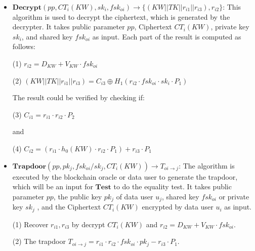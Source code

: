 \documentclass[journal,10pt]{IEEEtran}
\begin{document}
\begin{itemize}
    \item $ \boldsymbol{Decrypt}(pp, CT_i(KW), sk_{i}, fsk_{oi}) \to \{(KW||TK||r_{i1}||r_{i3}), r_{i2}\} $: This algorithm is used to decrypt the ciphertext, which is generated by the decrypter. It takes public parameter $pp$, Ciphertext $CT_i(KW)$, private key $sk_{i}$, and shared key $fsk_{oi}$ as input. Each part of the result is computed as follows: 
    
    (1) $r_{i2} = D_{KW} + V_{KW} \cdot fsk_{oi}$
    
    (2) $(KW||TK||r_{i1}||r_{i3}) = C_{i3} \oplus H_1(r_{i2} \cdot fsk_{oi} \cdot sk_i \cdot P_1)$
    
    The result could be verified by checking if: 
    
    (3) $C_{i1} = r_{i1} \cdot r_{i2} \cdot P_2$
    
    and 
    
    (4) $C_{i2} = (r_{i1} \cdot h_0(KW) \cdot r_{i2} \cdot P_1) + r_{i3} \cdot P_1$
    
    
    \item $ \boldsymbol{Trapdoor}(pp, pk_j, fsk_{oi}/sk_j, CT_i(KW)) \to T_{oi \to j} $: The algorithm is executed by the blockchain oracle or data user to generate the trapdoor, which will be an input for $\boldsymbol{Test}$ to do the equality test. It takes public parameter $pp$, the public key $pk_j$ of data user $u_j$, shared key $fsk_{oi}$ or private key $sk_j$ , and the Ciphertext $CT_i(KW)$ encrypted by data user $u_i$ as input.
    
    (1) Recover $r_{i1}, r_{i3}$ by decrypt $CT_i(KW)$ and $r_{i2} = D_{KW} + V_{KW} \cdot fsk_{oi}$. 
    
    (2) The trapdoor $T_{oi \to j} = r_{i1} \cdot r_{i2} \cdot fsk_{oi} \cdot pk_j - r_{i3} \cdot P_1$.
    
\end{itemize}
\end{document}
